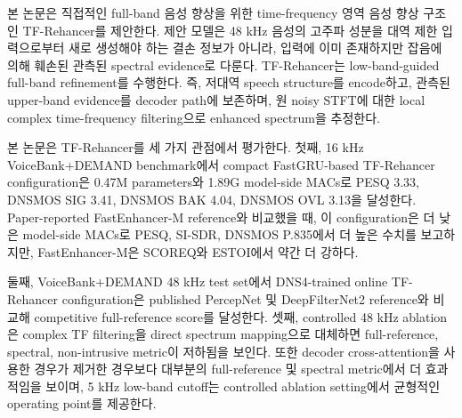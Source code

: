본 논문은 직접적인 full-band 음성 향상을 위한 time-frequency 영역 음성 향상 구조인 TF-Rehancer를 제안한다. 제안 모델은 48 kHz 음성의 고주파 성분을 대역 제한 입력으로부터 새로 생성해야 하는 결손 정보가 아니라, 입력에 이미 존재하지만 잡음에 의해 훼손된 관측된 spectral evidence로 다룬다. TF-Rehancer는 low-band-guided full-band refinement를 수행한다. 즉, 저대역 speech structure를 encode하고, 관측된 upper-band evidence를 decoder path에 보존하며, 원 noisy STFT에 대한 local complex time-frequency filtering으로 enhanced spectrum을 추정한다.

본 논문은 TF-Rehancer를 세 가지 관점에서 평가한다. 첫째, 16 kHz VoiceBank+DEMAND benchmark에서 compact FastGRU-based TF-Rehancer configuration은 0.47M parameters와 1.89G model-side MACs로 PESQ 3.33, DNSMOS SIG 3.41, DNSMOS BAK 4.04, DNSMOS OVL 3.13을 달성한다. Paper-reported FastEnhancer-M reference와 비교했을 때, 이 configuration은 더 낮은 model-side MACs로 PESQ, SI-SDR, DNSMOS P.835에서 더 높은 수치를 보고하지만, FastEnhancer-M은 SCOREQ와 ESTOI에서 약간 더 강하다.

둘째, VoiceBank+DEMAND 48 kHz test set에서 DNS4-trained online TF-Rehancer configuration은 published PercepNet 및 DeepFilterNet2 reference와 비교해 competitive full-reference score를 달성한다. 셋째, controlled 48 kHz ablation은 complex TF filtering을 direct spectrum mapping으로 대체하면 full-reference, spectral, non-intrusive metric이 저하됨을 보인다. 또한 decoder cross-attention을 사용한 경우가 제거한 경우보다 대부분의 full-reference 및 spectral metric에서 더 효과적임을 보이며, 5 kHz low-band cutoff는 controlled ablation setting에서 균형적인 operating point를 제공한다.
